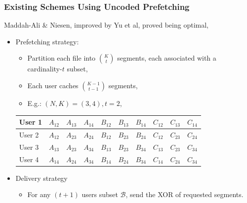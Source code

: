 \documentclass{beamer}
\begin{document}
\begin{frame}
\frametitle{Existing Schemes Using Uncoded Prefetching}
Maddah-Ali \& Niesen\footnotemark, improved by Yu et al\footnotemark, proved being optimal,
\begin{itemize}
\item Prefetching strategy:
	\begin{itemize}
	[circle]
	\item Partition each file into $\binom{K}{t}$ segments, each associated with a cardinality-$t$ subset,
	\item Each user caches $\binom{K-1}{t-1}$ segments,
	\item E.g.: $(N,K) = (3,4), t = 2$,
	\end{itemize}
\vspace*{-15pt}
\begin{table}[]
\centering
\begin{tabular}{|l||l|l|l|l|l|l|l|l|l|}
\hline
User 1 & $A_{12}$ & $A_{13}$ & $A_{14}$ & $B_{12}$ & $B_{13}$ & $B_{14}$ & $C_{12}$ & $C_{13}$ & $C_{14}$ \\ \hline
User 2 & $A_{12}$ & $A_{23}$ & $A_{24}$ & $B_{12}$& $B_{23}$ & $B_{24}$ & $C_{12}$ & $C_{23}$ & $C_{24}$ \\ \hline
User 3 & $A_{13}$ & $A_{23}$ & $A_{34}$ & $B_{13}$ & $B_{23}$ & $B_{34}$ & $C_{13}$ & $C_{23}$ & $C_{34}$ \\ \hline
User 4 & $A_{14}$ & $A_{24}$ & $A_{34}$ & $B_{14}$ & $B_{24}$ & $B_{34}$ & $C_{14}$ & $C_{24}$ & $C_{34}$ \\ \hline
\end{tabular}
\end{table}
\item Delivery strategy
	\begin{itemize}
	[circle]
	\item For any $(t+1)$ users subset $\mathcal{B}$, send the XOR of requested segments.
	\end{itemize}
\end{itemize}
\end{frame}
\end{document}
